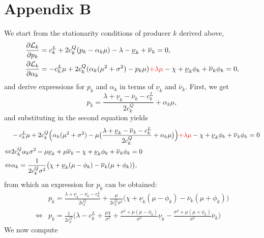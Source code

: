\documentclass{article}
\begin{document}
\section*{Appendix B}

We start from the stationarity conditions of producer $k$ derived above,
\begin{align*}
&\frac{\partial \mathcal{L}_k}{\partial p_k} = c_k^L + 2 c_k^Q (p_k - \alpha_k \mu) - \lambda - \underline{\nu}_k + \overline{\nu}_k = 0,\\
&\frac{\partial \mathcal{L}_k}{\partial \alpha_k} = - c_k^L \mu + 2 c_k^Q(\alpha_k(\mu^2 + \sigma^2) - p_k \mu) \textcolor{red}{+ \lambda \mu} - \chi + \underline{\nu}_k \phi_k + \overline{\nu}_k \phi_k = 0,\\
\end{align*}
and derive expressions for $p_k$ and $\alpha_k$ in terms of $\underline{\nu}_k$ and $\overline{\nu}_k$. First, we get
\begin{equation*}
p_k = \frac{\lambda + \underline{\nu}_k - \overline{\nu}_k - c_k^L}{2 c_k^Q} + \alpha_k \mu,
\end{equation*}
and substituting in the second equation yields
\begin{align*}
&- c_k^L \mu + 2 c_k^Q\Big(\alpha_k(\mu^2 + \sigma^2) - \mu\big(\frac{\lambda + \underline{\nu}_k - \overline{\nu}_k - c_k^L}{2 c_k^Q} + \alpha_k \mu\big)\Big) \textcolor{red}{+ \lambda \mu} - \chi + \underline{\nu}_k \phi_k + \overline{\nu}_k \phi_k = 0\\
\Leftrightarrow & 2 c_k^Q\alpha_k \sigma^2 - \mu \underline{\nu}_k + \mu \overline{\nu}_k - \chi + \underline{\nu}_k \phi_k + \overline{\nu}_k \phi_k = 0\\
\Leftrightarrow &\alpha_k = \frac{1}{2 c_k^Q \sigma^2}\big(\chi + \underline{\nu}_k(\mu - \phi_k) - \overline{\nu}_k (\mu + \phi_k)\big),
\end{align*}
from which an expression for $p_k$ can be obtained:
\begin{align*}
&p_k = \frac{\lambda + \underline{\nu}_k - \overline{\nu}_k - c_k^L}{2 c_k^Q} + \frac{\mu}{2 c_k^Q \sigma^2}\big(\chi + \underline{\nu}_k(\mu - \phi_k) - \overline{\nu}_k (\mu + \phi_k)\big)\\
\Leftrightarrow & p_k = \frac{1}{2 c_k^Q}\Big(\lambda - c_k^L + \frac{\mu \chi}{\sigma^2} + \frac{\sigma^2 + \mu(\mu - \phi_k)}{\sigma^2}\underline{\nu}_k - \frac{\sigma^2 + \mu(\mu + \phi_k)}{\sigma^2} \overline{\nu}_k\Big)
\end{align*}
We now compute
\end{document}
